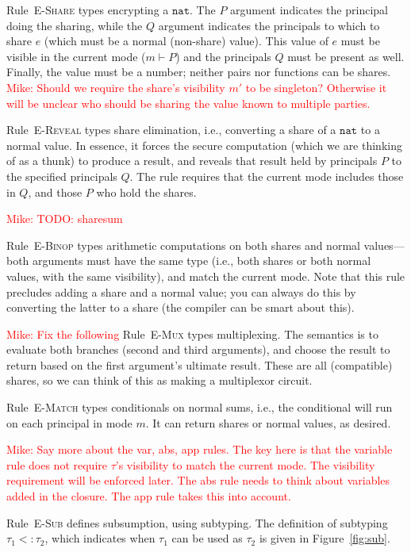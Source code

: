 \documentclass[10pt]{article}
\newcommand{\rulelab}[1]{{\small \textsc{#1}}}
\newcommand{\tnat}{\ensuremath{\mathtt{nat}}}
\newcommand{\subtype}{\ensuremath{<:}}
\newcommand{\issub}[2]{{#1} \subtype {#2}}
\newcommand{\mwh}[1]{\textcolor{red}{Mike: #1}}
\begin{document}
Rule~\rulelab{E-Share} types encrypting a $\tnat$. The $P$ argument
indicates the principal doing the sharing, while the $Q$ argument
indicates the principals to which to share $e$ (which must be a normal
(non-share) value). This value of $e$ must be visible in the current
mode ($m \vdash P$) and the principals $Q$ must be present as
well. Finally, the value must be a number; neither pairs nor functions
can be shares.  \mwh{Should we require the share's visibility $m'$ to
  be singleton?  Otherwise it will be unclear who should be sharing
  the value known to multiple parties.}

Rule~\rulelab{E-Reveal} types share elimination, i.e., converting a
share of a $\tnat$ to a normal value. In essence, it forces the secure
computation (which we are thinking of as a thunk) to produce a result,
and reveals that result held by principals $P$ to the specified
principals $Q$. The rule requires that the current mode includes those
in $Q$, and those $P$ who hold the shares.

\mwh{TODO: sharesum}

Rule~\rulelab{E-Binop} types arithmetic computations on both shares
and normal values---both arguments must have the same type (i.e., both
shares or both normal values, with the same visibility), and match the
current mode. Note that this rule precludes adding a 
share and a normal value; you can always do this by converting the
latter to a share (the compiler can be smart about this).

\mwh{Fix the following}
Rule~\rulelab{E-Mux} types multiplexing. The semantics is to evaluate
both branches (second and third arguments), and choose the result to
return based on the first argument's ultimate result. These are all
(compatible) shares, so we can think of this as making a multiplexor
circuit. 

Rule~\rulelab{E-Match} types conditionals on normal sums, i.e., the
conditional will run on each principal in mode $m$. It can return
shares or normal values, as desired. 

\mwh{Say more about the var, abs, app rules. The key here is that the
  variable rule does not require $\tau$'s visibility to match the
  current mode. The visibility requirement will be enforced later. The
  abs rule needs to think about variables added in the closure. The
  app rule takes this into account.}

Rule~\rulelab{E-Sub} defines subsumption, using subtyping.  The
definition of subtyping $\issub{\tau_1}{\tau_2}$, which indicates when
$\tau_1$ can be used as $\tau_2$ is given in Figure~\ref{fig:sub}.
\end{document}
